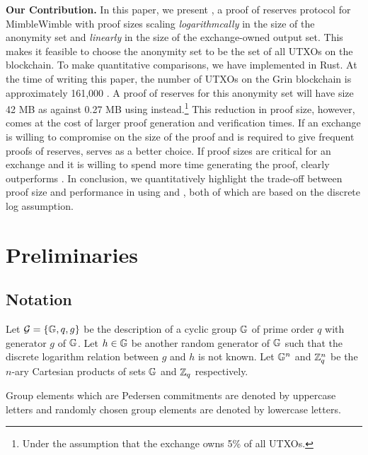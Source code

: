\noindent \textbf{Our Contribution.} In this paper, we present \Rplus, a proof of reserves protocol for MimbleWimble with proof sizes scaling \textit{logarithmcally} in the size of the anonymity set and \textit{linearly} in the size of the exchange-owned output set.
This makes it feasible to choose the anonymity set to be the set of all UTXOs on the blockchain.  
To make quantitative comparisons, we have implemented \RB  in Rust.
At the time of writing this paper, the number of UTXOs on the Grin blockchain is approximately 161,000 \cite{GrinScanWebsite}.
A \R proof of reserves for this anonymity set will have size 42 MB as against 0.27 MB using \RPlus instead.\footnote{Under the assumption that the exchange owns 5\% of all UTXOs.}
This reduction in proof size, however, comes at the cost of larger proof generation and verification times. If an exchange is willing to compromise on the size of the proof and is required to give frequent proofs of reserves,
\R serves as a better choice. If proof sizes are critical for an exchange and it is willing to spend more time generating the proof, \RB clearly outperforms \Rw.   
In conclusion, we quantitatively highlight the trade-off between proof size and performance in using \R and \RBw, both of which are based on the discrete log assumption.

%
%
%
\vspace{-2pt}
\section{Preliminaries}
\vspace{-4pt}
\subsection{Notation}
Let $\mathcal{G} = \{ \mathbb{G}, q, g \}$ be the description of a cyclic group $\mathbb{G}$ of prime order $q$ with generator $g$ of $\mathbb{G}$. Let $h\in \mathbb{G}$ be another random generator of $\mathbb{G}$ such that the discrete logarithm relation between $g$ and $h$ is not known. Let
$\mathbb{G}^n$ and $\mathbb{Z}^n_q$ be the $n$-ary Cartesian products of sets $\mathbb{G}$ and $\mathbb{Z}_q$ respectively.

Group elements which are Pedersen commitments are denoted by uppercase letters and randomly chosen group elements are denoted by lowercase letters.

